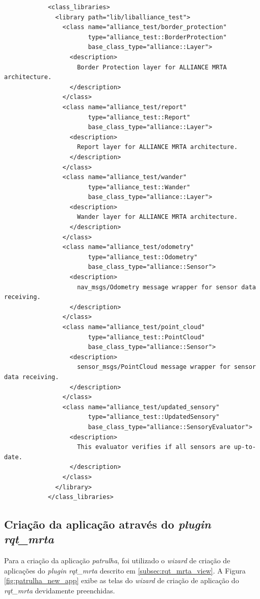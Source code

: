         \begin{lstlisting}
            <class_libraries>
              <library path="lib/liballiance_test">
                <class name="alliance_test/border_protection"
                       type="alliance_test::BorderProtection"
                       base_class_type="alliance::Layer">
                  <description>
                    Border Protection layer for ALLIANCE MRTA architecture.
                  </description>
                </class>
                <class name="alliance_test/report"
                       type="alliance_test::Report"
                       base_class_type="alliance::Layer">
                  <description>
                    Report layer for ALLIANCE MRTA architecture.
                  </description>
                </class>
                <class name="alliance_test/wander"
                       type="alliance_test::Wander"
                       base_class_type="alliance::Layer">
                  <description>
                    Wander layer for ALLIANCE MRTA architecture.
                  </description>
                </class>
                <class name="alliance_test/odometry"
                       type="alliance_test::Odometry"
                       base_class_type="alliance::Sensor">
                  <description>
                    nav_msgs/Odometry message wrapper for sensor data receiving.
                  </description>
                </class>
                <class name="alliance_test/point_cloud"
                       type="alliance_test::PointCloud"
                       base_class_type="alliance::Sensor">
                  <description>
                    sensor_msgs/PointCloud message wrapper for sensor data receiving.
                  </description>
                </class>
                <class name="alliance_test/updated_sensory"
                       type="alliance_test::UpdatedSensory"
                       base_class_type="alliance::SensoryEvaluator">
                  <description>
                    This evaluator verifies if all sensors are up-to-date.
                  </description>
                </class>
              </library>
            </class_libraries>
        \end{lstlisting}
    
        \subsection{Criação da aplicação através do \textit{plugin rqt\_mrta}} \label{subsec:criacao_patrulha}
            Para a criação da aplicação \textit{patrulha}, foi utilizado o \textit{wizard} de criação de aplicações do \textit{plugin rqt\_mrta} descrito em \ref{subsec:rqt_mrta_view}. A Figura \ref{fig:patrulha_new_app} exibe as telas do \textit{wizard} de criação de aplicação do \textit{rqt\_mrta} devidamente preenchidas.
        
